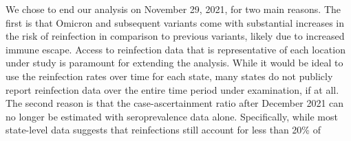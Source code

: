 We chose to end our analysis on November 29, 2021, for two main reasons. The
first is that Omicron and subsequent variants come with substantial increases in
the risk of reinfection in comparison to previous variants, likely due to
increased immune escape. \citep{wei2024risk, pulliam2022increased,
eythorsson2022rate} Access to reinfection data that is representative of each
location under study is paramount for extending the analysis. While it would be
ideal to use the reinfection rates over time for each \US state, many states do
not publicly report reinfection data over the entire time period under
examination, if at all.
%
The second reason is that the case-ascertainment ratio after December 2021 can
no longer be estimated with seroprevalence data alone. Specifically, while most
state-level data suggests that reinfections still account for less than 20\% of
